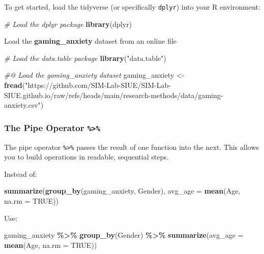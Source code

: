 \documentclass[
]{book}
\newenvironment{Shaded}{\begin{snugshade}}{\end{snugshade}}
\newcommand{\AttributeTok}[1]{\textcolor[rgb]{0.13,0.29,0.53}{#1}}
\newcommand{\CommentTok}[1]{\textcolor[rgb]{0.56,0.35,0.01}{\textit{#1}}}
\newcommand{\ConstantTok}[1]{\textcolor[rgb]{0.56,0.35,0.01}{#1}}
\newcommand{\FunctionTok}[1]{\textcolor[rgb]{0.13,0.29,0.53}{\textbf{#1}}}
\newcommand{\NormalTok}[1]{#1}
\newcommand{\OtherTok}[1]{\textcolor[rgb]{0.56,0.35,0.01}{#1}}
\newcommand{\SpecialCharTok}[1]{\textcolor[rgb]{0.81,0.36,0.00}{\textbf{#1}}}
\newcommand{\StringTok}[1]{\textcolor[rgb]{0.31,0.60,0.02}{#1}}
\begin{document}
To get started, load the tidyverse (or specifically \texttt{dplyr}) into your R environment:

\begin{Shaded}
\begin{Highlighting}[]
\CommentTok{\# Load the dplyr package}
\FunctionTok{library}\NormalTok{(dplyr)}
\end{Highlighting}
\end{Shaded}

Load the \textbf{gaming\_anxiety} dataset from an online file

\begin{Shaded}
\begin{Highlighting}[]
\CommentTok{\# Load the data.table package}
\FunctionTok{library}\NormalTok{(}\StringTok{"data.table"}\NormalTok{)}

\CommentTok{\#@ Load the gaming\_anxiety dataset}
\NormalTok{gaming\_anxiety }\OtherTok{\textless{}{-}} \FunctionTok{fread}\NormalTok{(}\StringTok{"https://github.com/SIM{-}Lab{-}SIUE/SIM{-}Lab{-}SIUE.github.io/raw/refs/heads/main/research{-}methods/data/gaming{-}anxiety.csv"}\NormalTok{)}
\end{Highlighting}
\end{Shaded}

\subsubsection*{\texorpdfstring{The Pipe Operator \texttt{\%\textgreater{}\%}}{The Pipe Operator \%\textgreater\%}}\label{the-pipe-operator}

The pipe operator \texttt{\%\textgreater{}\%} passes the result of one function into the next. This allows you to build operations in readable, sequential steps.

Instead of:

\begin{Shaded}
\begin{Highlighting}[]
\FunctionTok{summarize}\NormalTok{(}\FunctionTok{group\_by}\NormalTok{(gaming\_anxiety, Gender), }\AttributeTok{avg\_age =} \FunctionTok{mean}\NormalTok{(Age, }\AttributeTok{na.rm =} \ConstantTok{TRUE}\NormalTok{))}
\end{Highlighting}
\end{Shaded}

Use:

\begin{Shaded}
\begin{Highlighting}[]
\NormalTok{gaming\_anxiety }\SpecialCharTok{\%\textgreater{}\%}
  \FunctionTok{group\_by}\NormalTok{(Gender) }\SpecialCharTok{\%\textgreater{}\%}
  \FunctionTok{summarize}\NormalTok{(}\AttributeTok{avg\_age =} \FunctionTok{mean}\NormalTok{(Age, }\AttributeTok{na.rm =} \ConstantTok{TRUE}\NormalTok{))}
\end{Highlighting}
\end{Shaded}
\end{document}
